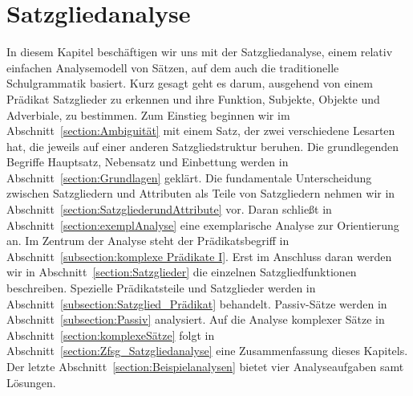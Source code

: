 \chapter{Satzgliedanalyse}\label{chap:Satzgliedanalyse}

In diesem Kapitel beschäftigen wir uns mit der Satzgliedanalyse, einem relativ einfachen Analysemodell von Sätzen, auf dem auch die traditionelle Schulgrammatik basiert. Kurz gesagt geht es darum, ausgehend von einem Prädikat Satzglieder zu erkennen und ihre Funktion, \zB Subjekte, Objekte und Adverbiale, zu bestimmen. Zum Einstieg beginnen wir im Abschnitt~\ref{section:Ambiguität} mit einem Satz, der zwei verschiedene Lesarten hat, die jeweils auf einer anderen Satzgliedstruktur beruhen. Die grundlegenden Begriffe Hauptsatz, Nebensatz und Einbettung werden in Abschnitt~\ref{section:Grundlagen} geklärt. Die fundamentale Unterscheidung zwischen Satzgliedern und Attributen als Teile von Satzgliedern nehmen wir in Abschnitt~\ref{section:SatzgliederundAttribute} vor. Daran schließt in Abschnitt~\ref{section:exemplAnalyse} eine exemplarische Analyse zur Orientierung an. Im Zentrum der Analyse steht der Prädikatsbegriff in Abschnitt~\ref{subsection:komplexe Prädikate I}. Erst im Anschluss daran werden wir in Abschnitt~\ref{section:Satzglieder} die einzelnen Satzgliedfunktionen beschreiben. Spezielle Prädikatsteile und Satzglieder werden in Abschnitt~\ref{subsection:Satzglied_Prädikat} behandelt. Passiv-Sätze werden in Abschnitt~\ref{subsection:Passiv} analysiert. Auf die Analyse komplexer Sätze in Abschnitt~\ref{section:komplexeSätze} folgt in Abschnitt~\ref{section:Zfsg_Satzgliedanalyse} eine Zusammenfassung dieses Kapitels. Der letzte Abschnitt~\ref{section:Beispielanalysen} bietet vier Analyseaufgaben samt Lösungen. 

